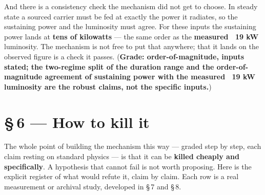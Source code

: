 \documentclass[11pt]{article}
\begin{document}
And there is a consistency check the mechanism did not get to choose. In steady state a sourced carrier must be fed at exactly the power it radiates, so the sustaining power and the luminosity must agree. For these inputs the sustaining power lands at \textbf{tens of kilowatts} --- the same order as the \textbf{measured ~19 kW} luminosity. The mechanism is not free to put that anywhere; that it lands on the observed figure is a check it passes. (\textbf{Grade: order-of-magnitude, inputs stated; the two-regime split of the duration range and the order-of-magnitude agreement of sustaining power with the measured ~19 kW luminosity are the robust claims, not the specific inputs.})

\section*{\S\,6 --- How to kill it}
The whole point of building the mechanism this way --- graded step by step, each claim resting on standard physics --- is that it can be \textbf{killed cheaply and specifically}. A hypothesis that cannot fail is not worth proposing. Here is the explicit register of what would refute it, claim by claim. Each row is a real measurement or archival study, developed in \S\,7 and \S\,8.
\end{document}
